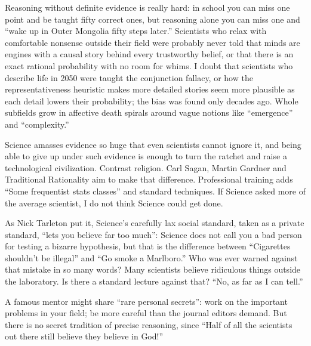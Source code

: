 Reasoning without definite evidence is really hard: in school you can miss one point and be taught fifty correct ones, but reasoning alone you can miss one and ``wake up in Outer Mongolia fifty steps later.'' Scientists who relax with comfortable nonsense outside their field were probably never told that minds are engines with a causal story behind every trustworthy belief, or that there is an exact rational probability with no room for whims. I doubt that scientists who describe life in 2050 were taught the conjunction fallacy, or how the representativeness heuristic makes more detailed stories seem more plausible as each detail lowers their probability; the bias was found only decades ago. Whole subfields grow in affective death spirals around vague notions like ``emergence'' and ``complexity.''

Science amasses evidence so huge that even scientists cannot ignore it, and being able to give up under such evidence is enough to turn the ratchet and raise a technological civilization. Contrast religion. Carl Sagan, Martin Gardner and Traditional Rationality aim to make that difference. Professional training adds ``Some frequentist stats classes'' and standard techniques. If Science asked more of the average scientist, I do not think Science could get done. 

As Nick Tarleton put it, Science's carefully lax social standard, taken as a private standard, ``lets you believe far too much'': Science does not call you a bad person for testing a bizarre hypothesis, but that is the difference between ``Cigarettes shouldn't be illegal'' and ``Go smoke a Marlboro.'' Who was ever warned against that mistake in so many words? Many scientists believe ridiculous things outside the laboratory. Is there a standard lecture against that? ``No, as far as I can tell.'' 

A famous mentor might share ``rare personal secrets'': work on the important problems in your field; be more careful than the journal editors demand.  But there is no secret tradition of precise reasoning, since ``Half of all the scientists out there still believe they believe in God!'' 
